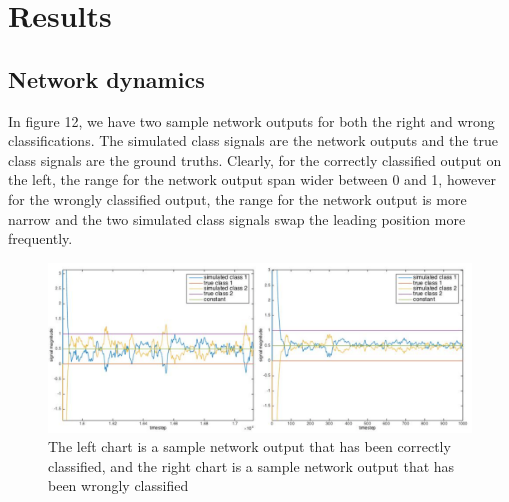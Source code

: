 \documentclass[a4paper,11pt,oneside]{article}
\begin{document}
\section{Results}
\subsection{Network dynamics}
In figure 12, we have two sample network outputs for both the right and wrong classifications. The simulated class signals are the network outputs and the true class signals are the ground truths. Clearly, for the correctly classified output on the left, the range for the network output span wider between 0 and 1, however for the wrongly classified output, the range for the network output is more narrow and the two simulated class signals swap the leading position more frequently.

\begin{figure}[h!]
	\centering
	\includegraphics[width=1.05\textwidth]{img/simulation}
	\caption{The left chart is a sample network output that has been correctly classified, and the right chart is a sample network output that has been wrongly classified}
\end{figure}
\end{document}
